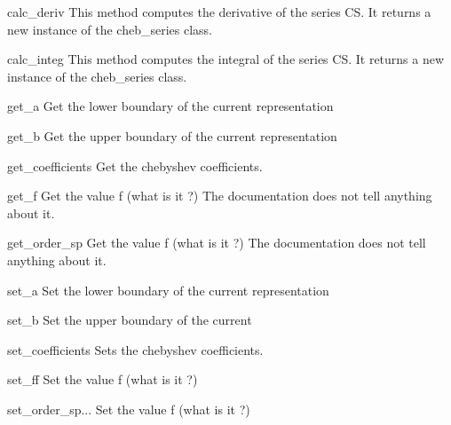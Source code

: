 \begin{methoddesc}{calc_deriv}{}
        This method computes the derivative of the series CS. It returns
        a new instance of the cheb_series class.
\end{methoddesc}
\begin{methoddesc}{calc_integ}{}
        This method computes the integral of the series CS. It returns
        a new instance of the cheb_series class.
\end{methoddesc}
\begin{methoddesc}{get_a}{}
        Get the lower boundary of the current representation       
\end{methoddesc}
\begin{methoddesc}{get_b}{}
        Get the upper boundary of the current representation        
\end{methoddesc}
\begin{methoddesc}{get_coefficients}{}
        Get the chebyshev coefficients.         
\end{methoddesc}
\begin{methoddesc}{get_f}{}
        Get the value f (what is it ?) The documentation does not tell anything
        about it.        
\end{methoddesc}
\begin{methoddesc}{get_order_sp}{}
        Get the value f (what is it ?) The documentation does not tell anything
        about it.        
\end{methoddesc}
\begin{methoddesc}{set_a}{}
        Set the lower boundary of the current representation        
\end{methoddesc}
\begin{methoddesc}{set_b}{}
        Set the upper boundary of the current         
\end{methoddesc}
\begin{methoddesc}{set_coefficients}{}
        Sets the chebyshev coefficients. 
\end{methoddesc}
\begin{methoddesc}{set_f}{f}
        Set the value f (what is it ?)        
\end{methoddesc}
\begin{methoddesc}{set_order_sp}{...}
        Set the value f (what is it ?)        
\end{methoddesc}



